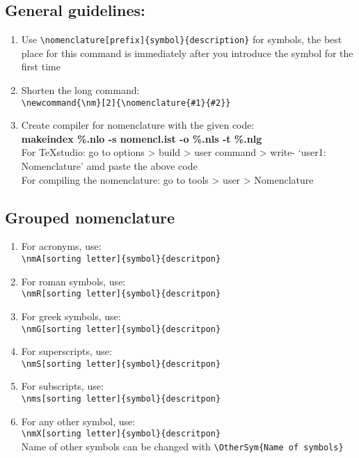 \subsection{General guidelines:}
\begin{enumerate}	
	\item Use \verb|\nomenclature[prefix]{symbol}{description}| for symbols, the best place for this command is immediately after you introduce the symbol for the first time
	\item Shorten the long command:\\ \verb|\newcommand{\nm}[2]{\nomenclature{#1}{#2}}|
	\item Create compiler for nomenclature with the given code: \\
	\textbf{makeindex \%.nlo -s nomencl.ist -o \%.nls -t \%.nlg }\\
	For TeXstudio: go to options > build > user command > write- `user1: Nomenclature' amd paste the above code\\
	For compiling the nomenclature: go to tools > user > Nomenclature	
\end{enumerate}	

\subsection{Grouped nomenclature}
\begin{enumerate}
\item For acronyms, use:\\
 \verb|\nmA[sorting letter]{symbol}{descritpon}|
\item For roman symbols, use:\\
\verb|\nmR[sorting letter]{symbol}{descritpon}|
\item For greek symbols, use:\\
 \verb|\nmG[sorting letter]{symbol}{descritpon}|
 \item For superscripts, use:\\
 \verb|\nmS[sorting letter]{symbol}{descritpon}|
 \item For subscripts, use:\\
 \verb|\nms[sorting letter]{symbol}{descritpon}| 
 \item For any other symbol, use:\\
 \verb|\nmX[sorting letter]{symbol}{descritpon}|\\
 Name of other symbols can be changed with \verb|\OtherSym{Name of symbols}|
\end{enumerate}
